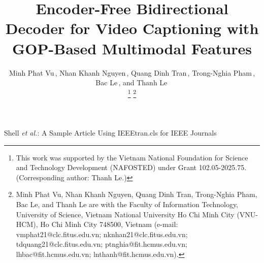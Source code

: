 \documentclass[lettersize,journal]{IEEEtran}
\begin{document}
\title{{\fontsize{24}{28}\selectfont Encoder-Free Bidirectional Decoder for Video Captioning with GOP-Based Multimodal Features}}


\author{Minh Phat Vu\,, Nhan Khanh Nguyen\,, Quang Dinh Tran\,, Trong-Nghia Pham\,, Bac Le\,, and Thanh Le\,

\thanks{This work was supported by the Vietnam National Foundation for Science and Technology Development (NAFOSTED) under Grant 102.05-2025.75. (Corresponding author: Thanh Le.)}
\thanks{Minh Phat Vu, Nhan Khanh Nguyen, Quang Dinh Tran, Trong-Nghia Pham, Bac Le, and Thanh Le are with the Faculty of Information Technology, University of Science, Vietnam National University Ho Chi Minh City (VNU-HCM), Ho Chi Minh City 748500, Vietnam (e-mail: vmphat21@clc.fitus.edu.vn; nknhan21@clc.fitus.edu.vn; tdquang21@clc.fitus.edu.vn; ptnghia@fit.hcmus.edu.vn; lhbac@fit.hcmus.edu.vn; lnthanh@fit.hcmus.edu.vn).}}


%
{Shell \MakeLowercase{\textit{et al.}}: A Sample Article Using IEEEtran.cls for IEEE Journals}

%

\maketitle
\end{document}
